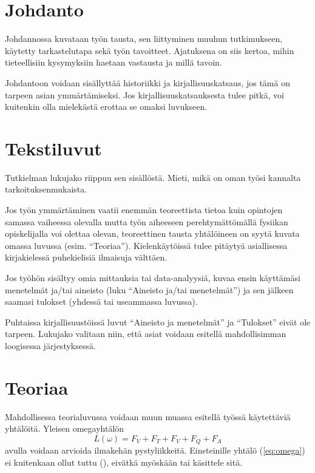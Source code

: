 \documentclass[finnish,twoside,openright]{HYgradu}
\begin{document}
\section{Johdanto}
Johdannossa kuvataan ty\"on tausta, sen liittyminen muuhun tutkimukseen, k\"aytetty tarkastelutapa sek\"a ty\"on tavoitteet. Ajatuksena on siis kertoa, mihin tieteellisiin kysymyksiin haetaan vastausta ja mill\"a tavoin.

Johdantoon voidaan sis\"allytt\"a\"a historiikki ja kirjallisuuskatsaus, jos t\"am\"a on tarpeen asian ymm\"art\"amiseksi. Jos kirjallisuuskatsauksesta tulee pitk\"a, voi kuitenkin olla mielek\"ast\"a erottaa se omaksi luvukseen.

\section{Tekstiluvut}

Tutkielman lukujako riippuu sen sis\"all\"ost\"a. Mieti, mik\"a on oman ty\"osi kannalta tarkoituksenmukaista.

Jos ty\"on ymm\"art\"aminen vaatii enemm\"an teoreettista tietoa kuin  opintojen samassa vaiheessa olevalla mutta ty\"on aiheeseen perehtym\"att\"om\"all\"a   fysiikan opiskelijalla voi olettaa olevan, teoreettinen tausta yht\"al\"oineen on syyt\"a kuvata omassa luvussa (esim. ``Teoriaa'').
Kielenk\"ayt\"oiss\"a tulee pit\"ayty\"a  asiallisessa kirjakieless\"a puhekielisi\"a ilmaisuja v\"altt\"aen.

Jos ty\"oh\"on sis\"altyy omia mittauksia tai data-analyysi\"a, kuvaa ensin k\"aytt\"am\"asi  menetelm\"at  ja/tai aineisto (luku ``Aineisto ja/tai  menetelm\"at'') ja sen j\"alkeen saamasi tulokset (yhdess\"a tai useammassa luvussa).

Puhtaissa kirjallisuust\"oiss\"a luvut ``Aineisto ja menetelm\"at'' ja ``Tulokset'' eiv\"at ole tarpeen. Lukujako valitaan niin, ett\"a  asiat  voidaan esitell\"a mahdollisimman loogisessa j\"arjestyksess\"a.

\section{Teoriaa}
%
%
Mahdollisessa teorialuvussa voidaan muun muassa esitell\"a ty\"oss\"a k\"aytett\"avi\"a yht\"al\"oit\"a. Yleisen omegayht\"al\"on
\begin{equation}
\label{eq:omega}
L(\omega)=F_V + F_T + F_V + F_Q + F_A
\end{equation}
avulla voidaan arvioida ilmakeh\"an pystyliikkeit\"a. Einsteinille  yht\"al\"o (\ref{eq:omega}) ei kuitenkaan ollut tuttu (\cite{einstein}), eiv\"atk\"a my\"osk\"a\"an \cite{latexcompanion} tai \cite{knuthwebsite} k\"asittele sit\"a. 
\end{document}
